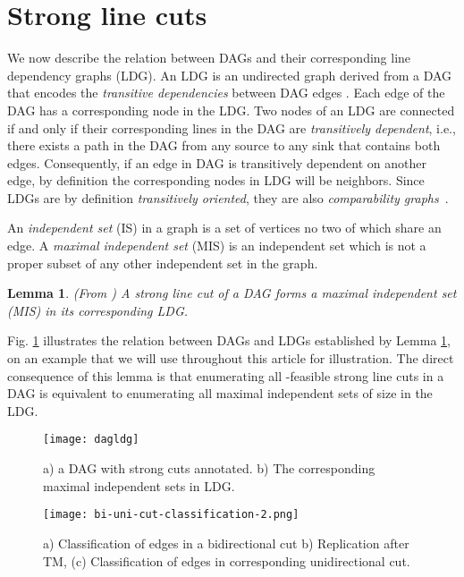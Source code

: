 \documentclass[journal]{IEEEtran}
\newtheorem{lemma}{Lemma}
\begin{document}
\section{Strong line cuts}

We now describe the relation between DAGs and their corresponding line dependency graphs (LDG).  An LDG is an undirected graph derived from a DAG that encodes the \emph{transitive dependencies} between DAG edges \cite{kagaris1999maximum}. Each edge  of the DAG has a corresponding node  in the LDG. Two nodes of an LDG are connected if and only if their corresponding lines in the DAG are \emph{transitively dependent}, i.e., there exists a path in the DAG from any source to any sink that contains both edges. Consequently, if an edge in DAG is transitively dependent on another edge, by definition the corresponding nodes in LDG will be neighbors. Since LDGs are by definition \emph{transitively oriented}, they are also \emph{comparability graphs}~\cite{golumbic2004algorithmic}.

An \emph{independent set} (IS) in a graph  is a set  of vertices no two of which share an edge. A \emph{maximal independent
  set} (MIS) is an independent set which is not a proper subset of any other independent set in the graph. 

\begin{lemma}
\label{lem:mis}
(From \cite{kagaris1999maximum}) A strong line cut of a DAG forms a maximal independent set (MIS) in its
corresponding LDG.
\end{lemma}


Fig. \ref{fig:cut} illustrates the relation between DAGs and LDGs established by Lemma \ref{lem:mis}, on an example that we will use throughout this article  for illustration. The direct consequence of this lemma is that enumerating all -feasible strong line cuts in a DAG is equivalent to enumerating all maximal independent sets of size  in the LDG.

\begin{figure}[h]
\centering
\texttt{[image: dagldg]}
\caption{\label{fig:cut} a) a DAG with strong cuts annotated. b) The corresponding  maximal independent sets in LDG.}
\end{figure}

\begin{figure*}[t]
\centering
\texttt{[image: bi-uni-cut-classification-2.png]}
\caption{\label{fig:bi-uni-cut-classification} a) Classification of edges in a bidirectional cut b) Replication after TM, (c) Classification of edges in corresponding unidirectional cut.}
\end{figure*}
\end{document}
